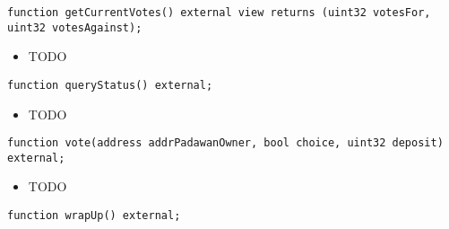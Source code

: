 \begin{lstlisting}[firstnumber=54]
    function getCurrentVotes() external view returns (uint32 votesFor, uint32 votesAgainst);
\end{lstlisting}
\begin{itemize}
\item TODO
\end{itemize}

\begin{lstlisting}[firstnumber=52]
    function queryStatus() external;
\end{lstlisting}
\begin{itemize}
\item TODO
\end{itemize}

\begin{lstlisting}[firstnumber=50]
    function vote(address addrPadawanOwner, bool choice, uint32 deposit) external;
\end{lstlisting}
\begin{itemize}
\item TODO
\end{itemize}

\begin{lstlisting}[firstnumber=53]
    function wrapUp() external;
\end{lstlisting}
